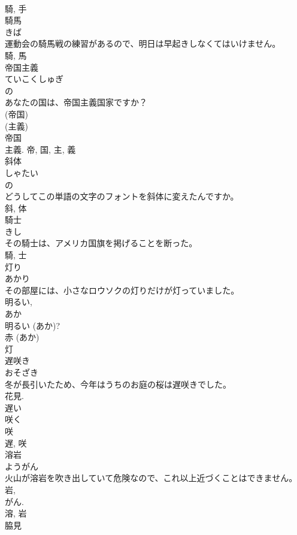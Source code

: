 \documentclass[8pt]{extreport}
\begin{document}
\begin{CJK}{UTF8}{min}
\\	騎, 手	
\\	騎馬	
\\	きば	
\\	運動会の騎馬戦の練習があるので、明日は早起きしなくてはいけません。	
\\	騎, 馬	
\\	帝国主義	
\\	ていこくしゅぎ	
\\	の 
\\	あなたの国は、帝国主義国家ですか？	
\\	(帝国) 
\\	(主義) 
\\	帝国 
\\	主義.	帝, 国, 主, 義	
\\	斜体	
\\	しゃたい	
\\	の 
\\	どうしてこの単語の文字のフォントを斜体に変えたんですか。	
\\	斜, 体	
\\	騎士	
\\	きし	
\\	その騎士は、アメリカ国旗を掲げることを断った。	
\\	騎, 士	
\\	灯り	
\\	あかり	
\\	その部屋には、小さなロウソクの灯りだけが灯っていました。	
\\	明るい, 
\\	あか 
\\	明るい (あか)? 
\\	赤 (あか) 
\\	灯	
\\	遅咲き	
\\	おそざき	
\\	冬が長引いたため、今年はうちのお庭の桜は遅咲きでした。	
\\	花見.	
\\	遅い 
\\	咲く 
\\	咲 
\\	遅, 咲	
\\	溶岩	
\\	ようがん	
\\	火山が溶岩を吹き出していて危険なので、これ以上近づくことはできません。	
\\	岩, 
\\	がん. 
\\	溶, 岩	
\\	脇見	

\end{CJK}
\end{document}
